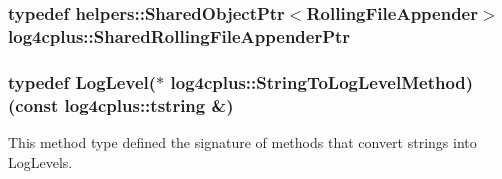 \hypertarget{namespacelog4cplus_a157dfdb199434cd2ace269a933b706b1}{
\subsubsection[{Shared\-Rolling\-File\-Appender\-Ptr}]{\setlength{\rightskip}{0pt plus 5cm}typedef {\bf helpers\-::\-Shared\-Object\-Ptr}$<${\bf Rolling\-File\-Appender}$>$ {\bf log4cplus\-::\-Shared\-Rolling\-File\-Appender\-Ptr}}}\label{namespacelog4cplus_a157dfdb199434cd2ace269a933b706b1}
\hypertarget{namespacelog4cplus_a8c44b16c1c39b70a117adea176b77275}{
\subsubsection[{String\-To\-Log\-Level\-Method}]{\setlength{\rightskip}{0pt plus 5cm}typedef {\bf Log\-Level}($\ast$ log4cplus\-::\-String\-To\-Log\-Level\-Method)(const {\bf log4cplus\-::tstring} \&)}}\label{namespacelog4cplus_a8c44b16c1c39b70a117adea176b77275}
This method type defined the signature of methods that convert strings into Log\-Levels.

